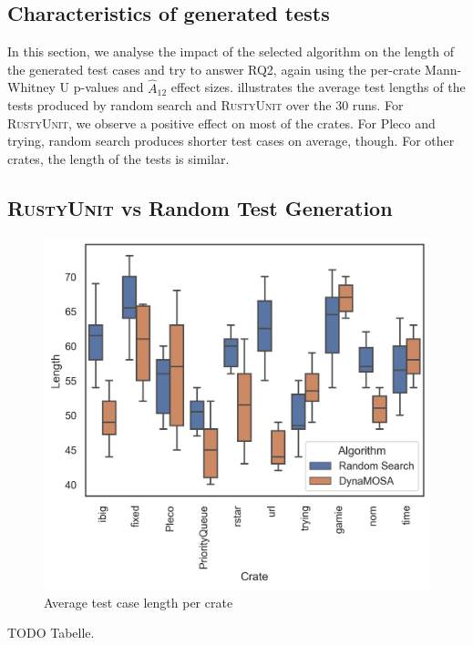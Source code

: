\documentclass[paper=a4,%
  twoside,%
  BCOR4mm,%
  abstract=true,%
  toc=bibliography,%
  chapterprefix=true,%
  toc=bibliographynumbered,%
  open=right,%
  english,%
  pagesize=pdftex]{scrreprt}
\newcommand{\tech}{\textsc{RustyUnit}\xspace}
\newcommand{\runs}{30\xspace}
\begin{document}
\subsection{Characteristics of generated tests}
In this section, we analyse the impact of the selected algorithm on the length of the generated test cases and try to answer RQ2, again using the per-crate Mann-Whitney U p-values and $\hat{A}_{12}$ effect sizes.  illustrates the average test lengths of the tests produced by random search and \tech over the \runs runs. For \tech, we observe a positive effect on most of the crates. For Pleco and  trying, random search produces shorter test cases on average, though. For other crates, the length of the tests is similar.  
\subsection{\tech vs Random Test Generation}
\begin{figure}[ht]
\caption{\label{fig:results-ru-rs-length}Average test case length per crate}
\centering
\includegraphics[width=\textwidth]{length}
\end{figure}


TODO Tabelle.
\end{document}
